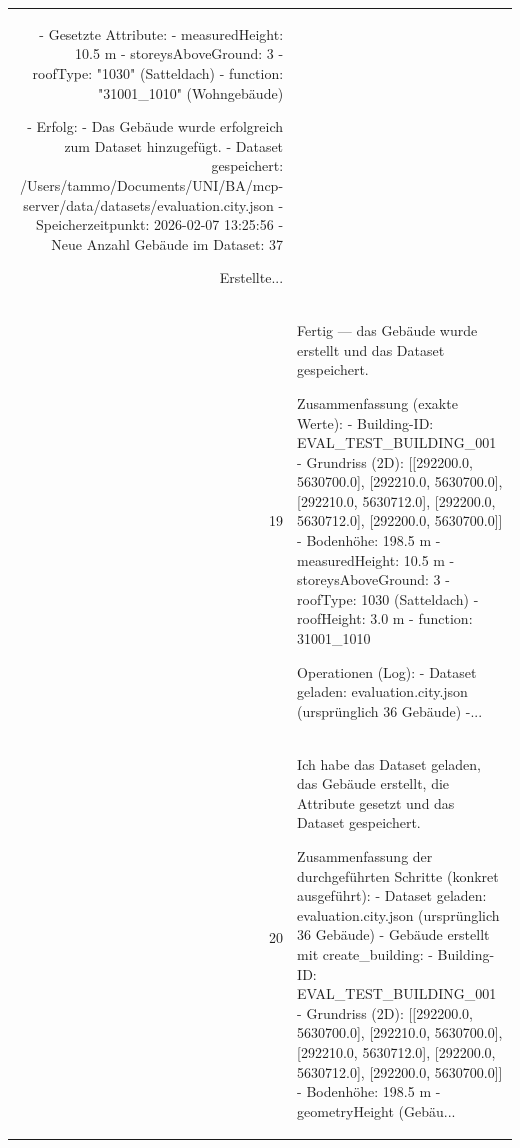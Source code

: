 \documentclass[a4paper,11pt]{article}
\begin{document}
\begin{table}[ht]
\begin{tabular}{r p{12cm}}
- Gesetzte Attribute:
  - measuredHeight: 10.5 m
  - storeysAboveGround: 3
  - roofType: "1030" (Satteldach)
  - function: "31001\_1010" (Wohngebäude)

- Erfolg:
  - Das Gebäude wurde erfolgreich zum Dataset hinzugefügt.
  - Dataset gespeichert: /Users/tammo/Documents/UNI/BA/mcp-server/data/datasets/evaluation.city.json
  - Speicherzeitpunkt: 2026-02-07 13:25:56
  - Neue Anzahl Gebäude im Dataset: 37

Erstellte... \\
19 & Fertig — das Gebäude wurde erstellt und das Dataset gespeichert.

Zusammenfassung (exakte Werte):
- Building-ID: EVAL\_TEST\_BUILDING\_001
- Grundriss (2D): [[292200.0, 5630700.0], [292210.0, 5630700.0], [292210.0, 5630712.0], [292200.0, 5630712.0], [292200.0, 5630700.0]]
- Bodenhöhe: 198.5 m
- measuredHeight: 10.5 m
- storeysAboveGround: 3
- roofType: 1030 (Satteldach)
- roofHeight: 3.0 m
- function: 31001\_1010

Operationen (Log):
- Dataset geladen: evaluation.city.json (ursprünglich 36 Gebäude)
-... \\
20 & Ich habe das Dataset geladen, das Gebäude erstellt, die Attribute gesetzt und das Dataset gespeichert.

Zusammenfassung der durchgeführten Schritte (konkret ausgeführt):
- Dataset geladen: evaluation.city.json (ursprünglich 36 Gebäude)
- Gebäude erstellt mit create\_building:
  - Building-ID: EVAL\_TEST\_BUILDING\_001
  - Grundriss (2D): [[292200.0, 5630700.0], [292210.0, 5630700.0], [292210.0, 5630712.0], [292200.0, 5630712.0], [292200.0, 5630700.0]]
  - Bodenhöhe: 198.5 m
  - geometryHeight (Gebäu... \\
\hline
\end{tabular}
\end{table}

\clearpage
\end{document}
